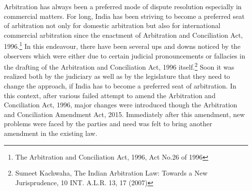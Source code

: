 \setcounter{figure}{0}
\setcounter{table}{0}
\setcounter{footnote}{0}

\label{2019-art5}

\begin{multicols}{2}


\noi
Arbitration has always been a preferred mode of dispute resolution especially in commercial
matters. For long, India has been striving to become a preferred seat of arbitration not only
for domestic arbitration but also for international commercial arbitration since the enactment
of Arbitration and Conciliation Act, 1996.\footnote{The Arbitration and Conciliation Act, 1996, Act No.26 of 1996} In this endeavour, there have been several ups and downs noticed by the observers which were either due to certain judicial pronouncements or fallacies in the drafting of the Arbitration and Conciliation Act, 1996 itself.\footnote{Sumeet Kachwaha, The Indian Arbitration Law: Towards a New Jurisprudence, 10 INT. A.L.R. 13, 17 (2007)}  Soon it was
realized both by the judiciary as well as by the legislature that they need to change the
approach, if India has to become a preferred seat of arbitration. In this context, after various
failed attempt to amend the Arbitration and Conciliation Act, 1996, major changes were
introduced though the Arbitration and Conciliation Amendment Act, 2015. Immediately after
this amendment, new problems were faced by the parties and need was felt to bring another
amendment in the existing law.


\end{multicols}
